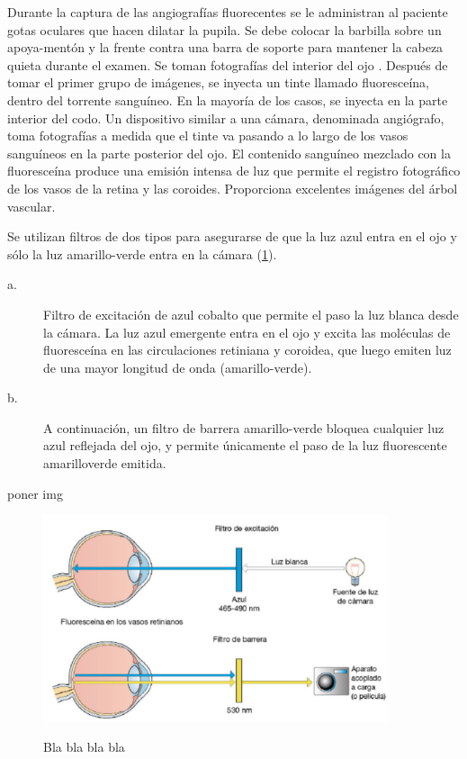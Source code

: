Durante la captura de las angiograf\'ias fluorecentes se le administran al paciente gotas oculares que hacen dilatar la pupila. Se debe colocar la barbilla sobre un apoya-ment\'on y la frente contra una barra de soporte para mantener la cabeza quieta durante el examen. Se toman fotograf\'ias del interior del ojo . Despu\'es de tomar el primer grupo de im\'agenes, se inyecta un tinte llamado fluoresce\'ina, dentro del  torrente sangu\'ineo. En la mayor\'ia de los casos, se inyecta en la parte interior del codo. Un dispositivo similar a una c\'amara, denominada angi\'ografo, toma fotograf\'ias a medida que el tinte va pasando a lo largo de los vasos sangu\'ineos en la parte posterior del ojo. El contenido sangu\'ineo mezclado con la fluoresce\'ina produce una emisi\'on intensa de luz que permite el registro fotogr\'afico de los vasos de la retina y las coroides. Proporciona excelentes im\'agenes del \'arbol vascular.


Se utilizan filtros de dos tipos para asegurarse de que la luz azul entra en el ojo y s\'olo la luz amarillo-verde entra en la c\'amara (\ref{fig:lightfilter}).
\begin{description}
  \item[a.] 
 Filtro de excitaci\'on de azul cobalto que permite el paso la luz blanca desde la c\'amara. La luz azul emergente
entra en el ojo y excita las mol\'eculas de fluoresce\'ina en las circulaciones retiniana y coroidea, que luego emiten
luz de una mayor longitud de onda (amarillo-verde).
\item[b.] A continuación, un filtro de barrera amarillo-verde bloquea cualquier luz azul reflejada del ojo, y permite
únicamente el paso de la luz fluorescente amarilloverde emitida.\cite{kanski2012oftalmologia}
\end{description}


poner img
\begin{figure}[H]
\centering
\includegraphics[width=0.9\textwidth]{./Figures/filtrosluz.pdf}
\label{fig:lightfilter}
\caption{ Bla bla bla bla}
\end{figure}



